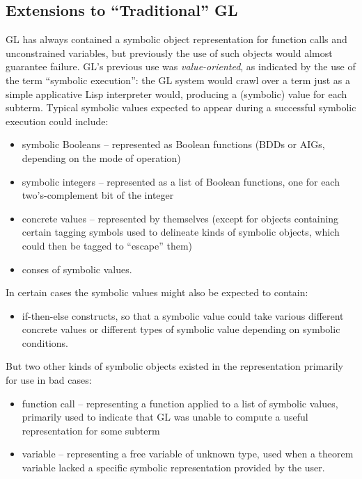 \documentclass[submission,copyright,creativecommons]{eptcs}
\begin{document}
\subsection{Extensions to ``Traditional'' GL}

GL has always contained a symbolic object
representation for function calls and unconstrained variables, but
previously the use of such objects would almost guarantee failure.
GL's previous use was {\em value-oriented}, as indicated by the use of the
term ``symbolic execution'': the GL system would crawl over a term
just as a simple applicative Lisp interpreter would, producing a
(symbolic) value for each subterm.  Typical symbolic values expected
to appear during a successful symbolic execution could include:

\begin{itemize}
\item symbolic Booleans -- represented as Boolean functions (BDDs or
  AIGs, depending on the mode of operation)
\item symbolic integers -- represented as a list of Boolean functions,
  one for each two's-complement bit of the integer
\item concrete values -- represented by themselves (except for objects
  containing certain tagging symbols used to delineate kinds of
  symbolic objects, which could then be tagged to ``escape'' them)
\item conses of symbolic values.
\end{itemize}

In certain cases the symbolic values might also be expected to contain:

\begin{itemize}
\item if-then-else constructs, so that a symbolic value could take
  various different concrete values or different types of symbolic
  value depending on symbolic conditions.
\end{itemize}

But two other kinds of symbolic objects existed in the representation
primarily for use in bad cases:

\begin{itemize}
\item function call -- representing a function applied to a list of
  symbolic values, primarily used to indicate that GL was unable to
  compute a useful representation for some subterm
\item variable -- representing a free variable of unknown type, used
  when a theorem variable lacked a specific symbolic representation
  provided by the user.
\end{itemize}
\end{document}
